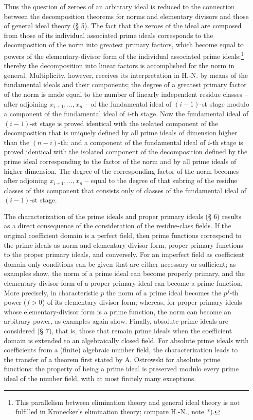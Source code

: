 \documentclass[11pt]{article}
\begin{document}
Thus the question of zeroes of an arbitrary ideal is reduced to the connection between the decomposition theorems for norms and elementary divisors and those of general ideal theory (§ 5). The fact that the zeroes of the ideal are composed from those of its individual associated prime ideals corresponds to the decomposition of the norm into greatest primary factors, which become equal to powers of the elementary-divisor form of the individual associated prime ideals;\footnote{This parallelism between elimination theory and general ideal theory is not fulfilled in Kronecker's elimination theory; compare H.-N., note *).} thereby the decomposition into linear factors is accomplished for the norm in general. Multiplicity, however, receives its interpretation in H.-N. by means of the fundamental ideals and their components; the degree of a greatest primary factor of the norm is made equal to the number of linearly independent residue classes -- after adjoining $x_{i+1},\ldots,x_n$ -- of the fundamental ideal of $(i-1)$-st stage modulo a component of the fundamental ideal of $i$-th stage. Now the fundamental ideal of $(i-1)$-st stage is proved identical with the isolated component of the decomposition that is uniquely defined by all prime ideals of dimension higher than the $(n-i)$-th; and a component of the fundamental ideal of $i$-th stage is proved identical with the isolated component of the decomposition defined by the prime ideal corresponding to the factor of the norm and by all prime ideals of higher dimension. The degree of the corresponding factor of the norm becomes -- after adjoining $x_{i+1},\ldots,x_n$ -- equal to the degree of that subring of the residue classes of this component that consists only of classes of the fundamental ideal of $(i-1)$-st stage.

The characterization of the prime ideals and proper primary ideals (§ 6) results as a direct consequence of the consideration of the residue-class fields. If the original coefficient domain is a perfect field, then prime functions correspond to the prime ideals as norm and elementary-divisor form, proper primary functions to the proper primary ideals, and conversely. For an imperfect field as coefficient domain only conditions can be given that are either necessary or sufficient; as examples show, the norm of a prime ideal can become properly primary, and the elementary-divisor form of a proper primary ideal can become a prime function. More precisely, in characteristic $p$ the norm of a prime ideal becomes the $p^f$-th power ($f>0$) of its elementary-divisor form; whereas, for proper primary ideals whose elementary-divisor form is a prime function, the norm can become an arbitrary power, as examples again show. Finally, absolute prime ideals are considered (§ 7), that is, those that remain prime ideals when the coefficient domain is extended to an algebraically closed field. For absolute prime ideals with coefficients from a (finite) algebraic number field, the characterization leads to the transfer of a theorem first stated by A. Ostrowski for absolute prime functions: the property of being a prime ideal is preserved modulo every prime ideal of the number field, with at most finitely many exceptions.
\end{document}
